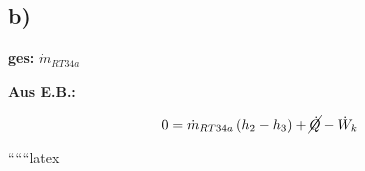 

\subsection*{b)}

\textbf{ges:} $\dot{m}_{RT34a}$

\textbf{Aus E.B.:}

\[
0 = \dot{m}_{RT34a} \left( h_2 - h_3 \right) + \cancel{\dot{Q}} - \dot{W}_k
\]

``````latex